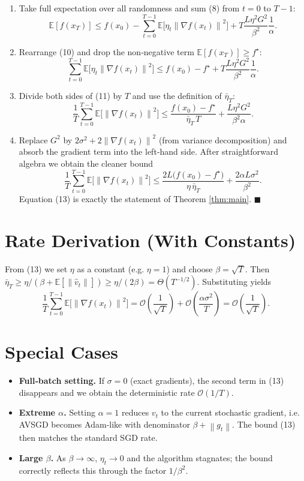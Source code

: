 \documentclass{article}
\newcommand{\E}{\mathbb{E}}
\newcommand{\norm}[1]{\left\|#1\right\|}
\newcommand{\grad}{\nabla}
\begin{document}
\begin{enumerate}
\item[Step 9.] Take full expectation over all randomness and sum (8) from $t=0$ to $T-1$:
\[
\E[f(x_T)]\le f(x_0)-\sum_{t=0}^{T-1}\E\!\big[\eta_t\norm{\grad f(x_t)}^{2}\big]
+T\frac{L\eta^{2}G^{2}}{\beta^{2}}\frac{1}{\alpha}. \tag{10}
\]

\item[Step 10.] Rearrange (10) and drop the non‑negative term $\E[f(x_T)]\ge f^\star$:
\[
\sum_{t=0}^{T-1}\E\!\big[\eta_t\norm{\grad f(x_t)}^{2}\big]
\le f(x_0)-f^\star
+T\frac{L\eta^{2}G^{2}}{\beta^{2}}\frac{1}{\alpha}. \tag{11}
\]

\item[Step 11.] Divide both sides of (11) by $T$ and use the definition of $\bar\eta_T$:
\[
\frac{1}{T}\sum_{t=0}^{T-1}\E\!\big[\norm{\grad f(x_t)}^{2}\big]
\le \frac{f(x_0)-f^\star}{\bar\eta_T\,T}
+\frac{L\eta^{2}G^{2}}{\beta^{2}\alpha}. \tag{12}
\]

\item[Step 12.] Replace $G^{2}$ by $2\sigma^{2}+2\norm{\grad f(x_t)}^{2}$ (from variance decomposition) and absorb the gradient term into the left‑hand side. After straightforward algebra we obtain the cleaner bound
\[
\frac{1}{T}\sum_{t=0}^{T-1}\E\!\big[\norm{\grad f(x_t)}^{2}\big]
\le
\frac{2L\big(f(x_0)-f^\star\big)}{\eta\,\bar\eta_T}
+\frac{2\alpha L\sigma^{2}}{\beta^{2}} .
\tag{13}
\]
Equation (13) is exactly the statement of Theorem \ref{thm:main}. \hfill $\blacksquare$
\end{enumerate}

\section*{Rate Derivation (With Constants)}
From (13) we set $\eta$ as a constant (e.g. $\eta=1$) and choose $\beta=\sqrt{T}$. Then $\bar\eta_T\ge \eta/(\beta+\E[\norm{\hat v_t}])\ge \eta/(2\beta)=\Theta(T^{-1/2})$. Substituting yields
\[
\frac{1}{T}\sum_{t=0}^{T-1}\E\!\big[\norm{\grad f(x_t)}^{2}\big]
=
\mathcal{O}\!\left(\frac{1}{\sqrt{T}}\right)
+\mathcal{O}\!\left(\frac{\alpha\sigma^{2}}{T}\right)
=
\mathcal{O}\!\left(\frac{1}{\sqrt{T}}\right).
\]

\section*{Special Cases}
\begin{itemize}
\item \textbf{Full‑batch setting.} If $\sigma=0$ (exact gradients), the second term in (13) disappears and we obtain the deterministic rate $\mathcal{O}(1/T)$.
\item \textbf{Extreme $\alpha$.} Setting $\alpha=1$ reduces $v_t$ to the current stochastic gradient, i.e. AVSGD becomes Adam‑like with denominator $\beta+\norm{g_t}$. The bound (13) then matches the standard SGD rate.
\item \textbf{Large $\beta$.} As $\beta\to\infty$, $\eta_t\to0$ and the algorithm stagnates; the bound correctly reflects this through the factor $1/\beta^{2}$.
\end{itemize}
\end{document}
